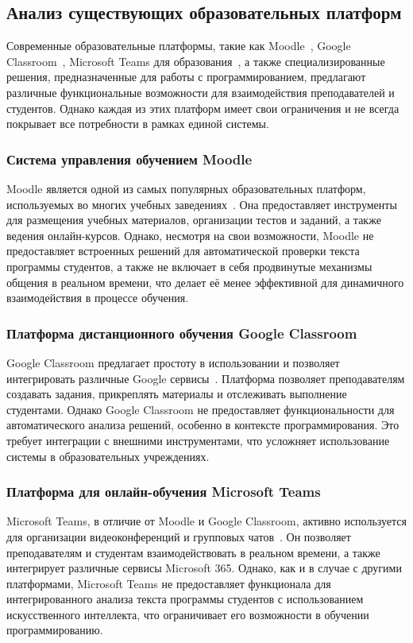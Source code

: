 \subsection{Анализ существующих образовательных платформ}

Современные образовательные платформы, такие как Moodle~\cite{moodle_docs}, Google Classroom~\cite{google_classroom}, Microsoft Teams для образования~\cite{microsoft_teams_education}, а также специализированные решения, предназначенные для работы с программированием, предлагают различные функциональные возможности для взаимодействия преподавателей и студентов. Однако каждая из этих платформ имеет свои ограничения и не всегда покрывает все потребности в рамках единой системы.

\subsubsection{Система управления обучением Moodle}
Moodle является одной из самых популярных образовательных платформ, используемых во многих учебных заведениях~\cite{moodle_docs}. Она предоставляет инструменты для размещения учебных материалов, организации тестов и заданий, а также ведения онлайн-курсов. Однако, несмотря на свои возможности, Moodle не предоставляет встроенных решений для автоматической проверки текста программы студентов, а также не включает в себя продвинутые механизмы общения в реальном времени, что делает её менее эффективной для динамичного взаимодействия в процессе обучения.

\subsubsection{Платформа дистанционного обучения Google Classroom}
Google Classroom предлагает простоту в использовании и позволяет интегрировать различные Google сервисы~\cite{google_classroom}. Платформа позволяет преподавателям создавать задания, прикреплять материалы и отслеживать выполнение студентами. Однако Google Classroom не предоставляет функциональности для автоматического анализа решений, особенно в контексте программирования. Это требует интеграции с внешними инструментами, что усложняет использование системы в образовательных учреждениях.

\subsubsection{Платформа для онлайн-обучения Microsoft Teams}
Microsoft Teams, в отличие от Moodle и Google Classroom, активно используется для организации видеоконференций и групповых чатов~\cite{microsoft_teams_education}. Он позволяет преподавателям и студентам взаимодействовать в реальном времени, а также интегрирует различные сервисы Microsoft 365. Однако, как и в случае с другими платформами, Microsoft Teams не предоставляет функционала для интегрированного анализа текста программы студентов с использованием искусственного интеллекта, что ограничивает его возможности в обучении программированию.

